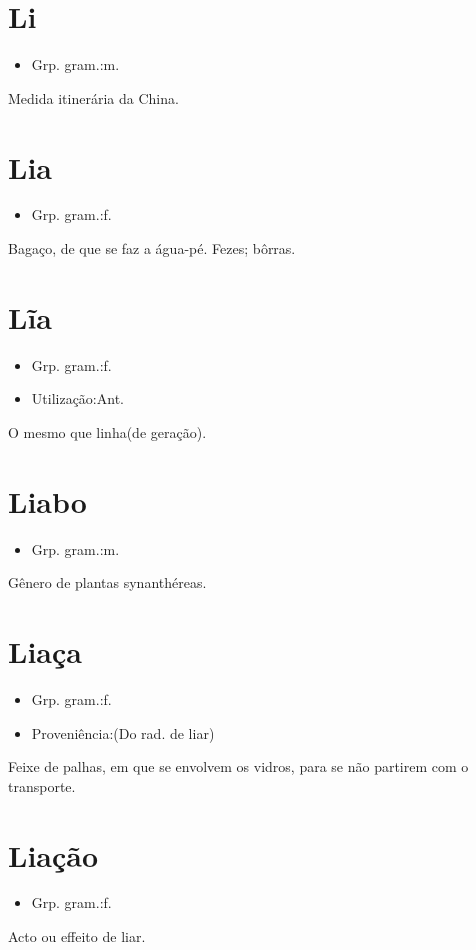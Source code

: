 \section{Li}
\begin{itemize}
\item {Grp. gram.:m.}
\end{itemize}
Medida itinerária da China.
\section{Lia}
\begin{itemize}
\item {Grp. gram.:f.}
\end{itemize}
Bagaço, de que se faz a água-pé.
Fezes; bôrras.
\section{Lĩa}
\begin{itemize}
\item {Grp. gram.:f.}
\end{itemize}
\begin{itemize}
\item {Utilização:Ant.}
\end{itemize}
O mesmo que \textunderscore linha\textunderscore  (de geração).
\section{Liabo}
\begin{itemize}
\item {Grp. gram.:m.}
\end{itemize}
Gênero de plantas synanthéreas.
\section{Liaça}
\begin{itemize}
\item {Grp. gram.:f.}
\end{itemize}
\begin{itemize}
\item {Proveniência:(Do rad. de \textunderscore liar\textunderscore )}
\end{itemize}
Feixe de palhas, em que se envolvem os vidros, para se não partirem com o transporte.
\section{Liação}
\begin{itemize}
\item {Grp. gram.:f.}
\end{itemize}
Acto ou effeito de liar.

